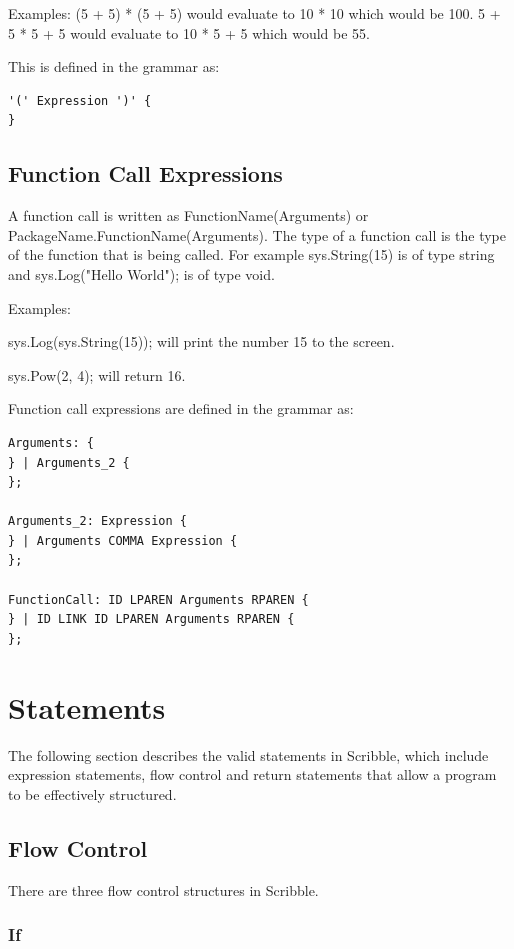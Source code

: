\documentclass[]{final_report}
\begin{document}
Examples: (5 + 5) * (5 + 5) would evaluate to 10 * 10 which would be 100. 5 + 5 * 5 + 5 would evaluate to 10 * 5 + 5 which would be 55.

This is defined in the grammar as:
\begin{verbatim}
'(' Expression ')' {
}
\end{verbatim}

\subsection{Function Call Expressions}

A function call is written as FunctionName(Arguments) or PackageName.FunctionName(Arguments). The type of a function call is the type of the function that is being called. For example sys.String(15) is of type string and sys.Log("Hello World"); is of type void.

Examples:

sys.Log(sys.String(15)); will print the number 15 to the screen.

sys.Pow(2, 4); will return 16.

Function call expressions are defined in the grammar as:
\begin{verbatim}
Arguments: {
} | Arguments_2 {
};

Arguments_2: Expression {
} | Arguments COMMA Expression {
};

FunctionCall: ID LPAREN Arguments RPAREN {
} | ID LINK ID LPAREN Arguments RPAREN {
};
\end{verbatim}

\section{Statements}

The following section describes the valid statements in Scribble, which include expression statements, flow control and return statements that allow a program to be effectively structured.

\subsection{Flow Control}

There are three flow control structures in Scribble.

\subsubsection{If}
\end{document}
